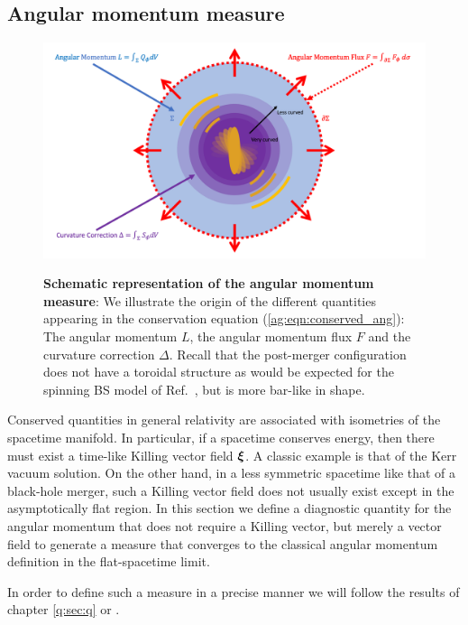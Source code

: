 \subsection{Angular momentum measure}\label{ag:sec:methods}

\begin{figure}[h!]
\begin{center}
    {\includegraphics[width=0.75\columnwidth]{ag_fig/FigureRobinPaper.png}}
\caption{{\bf Schematic representation of the angular momentum measure}: We illustrate the origin of the different quantities 
appearing in the conservation equation
(\ref{ag:eqn:conserved_ang}): The angular momentum
    ${L}$, the {angular momentum flux} $F$ and the
    curvature correction ${\Delta}$. Recall that the post-merger
    configuration does not have a toroidal structure
    as would be expected for the spinning BS model of
    Ref.~\cite{PhysRevD.90.024068,Yoshida:1997qf}, but is more bar-like in shape.
    }
\label{ag:fig:AngMomTrick}
\end{center}
\end{figure}

Conserved quantities in general relativity are associated with isometries of the spacetime manifold. In particular, if a spacetime conserves energy, then there must exist a time-like Killing vector field $\boldsymbol{\xi}$. A classic example is that of the Kerr vacuum solution. On the other hand, in a less symmetric spacetime like that of a black-hole merger, such a Killing vector field does not usually exist except in the asymptotically flat region. In this section we define a diagnostic quantity for the angular momentum that does not require a Killing vector, but merely a vector field to generate a measure that
converges to the classical angular momentum definition
in the flat-spacetime limit.

In order to define such a measure in a
precise manner we will follow the results of chapter \ref{q:sec:q} or \cite{Croft:2022gks,Clough:2021qlv}.



